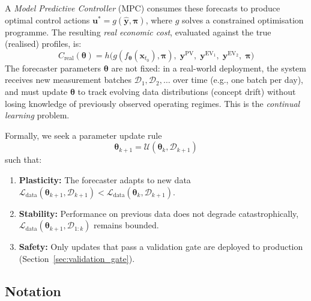 \documentclass[journal]{IEEEtran}
\begin{document}
A \emph{Model Predictive Controller} (MPC) consumes these forecasts to
produce optimal control actions $\mathbf{u}^* = g(\hat{\mathbf{y}},
\boldsymbol{\pi})$, where $g$ solves a constrained optimisation
programme. The resulting \emph{real economic cost}, evaluated against
the true (realised) profiles, is:
\begin{equation}
    C_{\mathrm{real}}(\boldsymbol{\theta}) = h\bigl(
        g(f_{\boldsymbol{\theta}}(\mathbf{x}_{t_0}), \boldsymbol{\pi}),\;
        \mathbf{y}^{\mathrm{PV}},\;
        \mathbf{y}^{\mathrm{EV}_1},\;
        \mathbf{y}^{\mathrm{EV}_2},\;
        \boldsymbol{\pi}
    \bigr)
    \label{eq:real_cost}
\end{equation}
The forecaster parameters $\boldsymbol{\theta}$ are not fixed: in a
real-world deployment, the system receives new measurement batches
$\mathcal{D}_1, \mathcal{D}_2, \ldots$ over time (e.g., one batch per
day), and must update $\boldsymbol{\theta}$ to track evolving data
distributions (concept drift) without losing knowledge of previously
observed operating regimes. This is the \emph{continual learning}
problem.

Formally, we seek a parameter update rule
$$\boldsymbol{\theta}_{k+1} = \mathcal{U}(\boldsymbol{\theta}_k,
\mathcal{D}_{k+1})$$ such that:
\begin{enumerate}
    \item \textbf{Plasticity:} The forecaster adapts to new data 
    $\mathcal{L}_{\mathrm{data}}(\boldsymbol{\theta}_{k+1},
    \mathcal{D}_{k+1}) < \mathcal{L}_{\mathrm{data}}(
    \boldsymbol{\theta}_k, \mathcal{D}_{k+1})$.
    \item \textbf{Stability:} Performance on previous data does not
    degrade catastrophically, 
    $\mathcal{L}_{\mathrm{data}}(\boldsymbol{\theta}_{k+1},
    \mathcal{D}_{1:k})$ remains bounded.
    \item \textbf{Safety:} Only updates that pass a validation gate
    are deployed to production (Section~\ref{sec:validation_gate}).
\end{enumerate}

\subsection{Notation}
\label{sec:notation}
\end{document}
